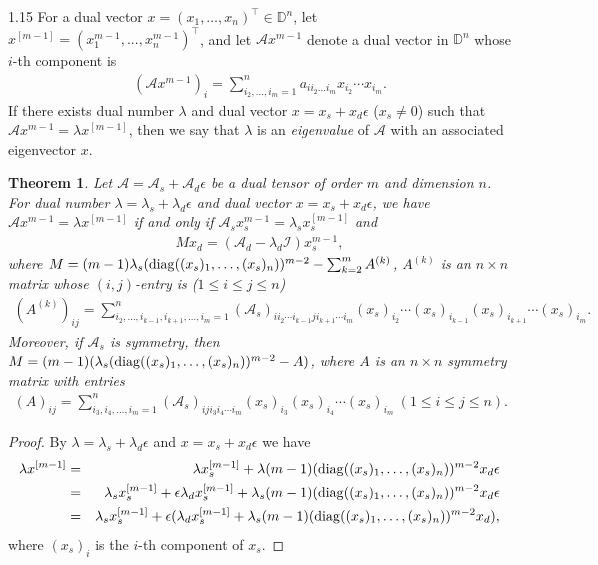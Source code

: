 \documentclass[preprint,12pt]{elsarticle}
\newtheorem{thm}{Theorem}[section]
\begin{document}
\begin{spacing}{1.15}
For a dual vector $x=(x_{1},\ldots,x_{n})^\top\in\mathbb{D}^{n}$, let $x^{[m-1]}=(x_1^{m-1},...,x_n^{m-1})^\top$, and let $\mathcal{A}x^{m-1}$ denote a dual vector in $\mathbb{D}^{n}$ whose $i$-th component is
\begin{eqnarray*}
(\mathcal{A}x^{m-1})_i=\sum_{i_{2},...,i_{m}=1}^{n}a_{ii_{2}...i_{m}}x_{i_{2}}\cdots x_{i_{m}}.
\end{eqnarray*}
If there exists dual number $\lambda$ and dual vector $x=x_s+x_d\epsilon$ ($x_s\neq0$) such that $\mathcal{A}x^{m-1}=\lambda x^{[m-1]}$, then we say that $\lambda$ is an \textit{eigenvalue} of $\mathcal{A}$ with an associated eigenvector $x$.
\begin{thm}
Let $\mathcal{A}=\mathcal{A}_s+\mathcal{A}_d\epsilon$ be a dual tensor of order $m$ and dimension $n$. For dual number $\lambda=\lambda_s+\lambda_d\epsilon$ and dual vector $x=x_s+x_d\epsilon$, we have $\mathcal{A}x^{m-1}=\lambda x^{[m-1]}$ if and only if $\mathcal{A}_sx_s^{m-1}=\lambda_sx_s^{[m-1]}$ and
\begin{eqnarray*}
Mx_d=(\mathcal{A}_d-\lambda_d\mathcal{I})x_s^{m-1},
\end{eqnarray*}
where $M=(m-1)\lambda_s({\rm diag}((x_s)_1,\ldots,(x_s)_n))^{m-2}-\sum_{k=2}^mA^{(k)}$, $A^{(k)}$ is an $n\times n$ matrix whose $(i,j)$-entry is ($1\leq i\leq j\leq n$)
\begin{eqnarray*}
(A^{(k)})_{ij}=\sum_{i_2,\ldots,i_{k-1},i_{k+1},\ldots,i_m=1}^n(\mathcal{A}_s)_{ii_2\cdots i_{k-1}ji_{k+1}\cdots i_m}(x_s)_{i_2}\cdots (x_s)_{i_{k-1}}(x_s)_{i_{k+1}}\cdots(x_s)_{i_m}.
\end{eqnarray*}
Moreover, if $\mathcal{A}_s$ is symmetry, then $M=(m-1)(\lambda_s({\rm diag}((x_s)_1,\ldots,(x_s)_n))^{m-2}-A)$, where $A$ is an $n\times n$ symmetry matrix with entries
\begin{eqnarray*}
(A)_{ij}=\sum_{i_3,i_4,\ldots,i_m=1}^n(\mathcal{A}_s)_{iji_3i_4\cdots i_m}(x_s)_{i_3}(x_s)_{i_4}\cdots(x_s)_{i_m}~(1\leq i\leq j\leq n).
\end{eqnarray*}
\end{thm}
\begin{proof}
By $\lambda=\lambda_s+\lambda_d\epsilon$ and $x=x_s+x_d\epsilon$ we have
\begin{eqnarray*}
\lambda x^{[m-1]}&=&\lambda x_s^{[m-1]}+\lambda(m-1)({\rm diag}((x_s)_1,\ldots,(x_s)_n))^{m-2}x_d\epsilon\\
&=&\lambda_sx_s^{[m-1]}+\epsilon\lambda_dx_s^{[m-1]}+\lambda_s(m-1)({\rm diag}((x_s)_1,\ldots,(x_s)_n))^{m-2}x_d\epsilon\\
&=&\lambda_sx_s^{[m-1]}+\epsilon(\lambda_dx_s^{[m-1]}+\lambda_s(m-1)({\rm diag}((x_s)_1,\ldots,(x_s)_n))^{m-2}x_d),
\end{eqnarray*}
where $(x_s)_i$ is the $i$-th component of $x_s$.


\end{proof}
\end{spacing}
\end{document}
